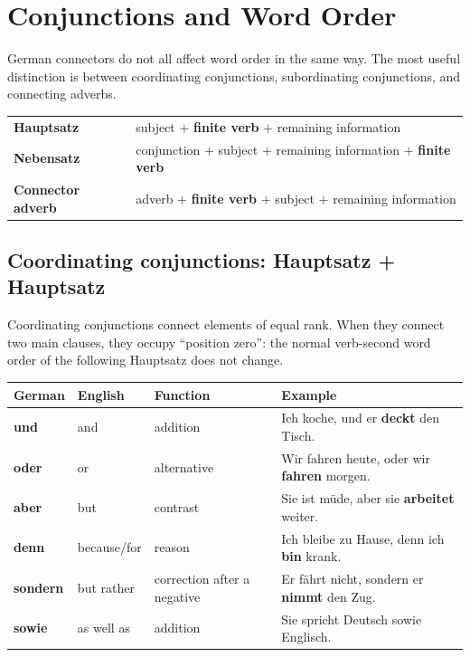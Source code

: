 \chapter{Conjunctions and Word Order}

German connectors do not all affect word order in the same way. The most
useful distinction is between coordinating conjunctions, subordinating
conjunctions, and connecting adverbs.

\begin{tcolorbox}[
  colback=black!3,
  colframe=black!55,
  title={Three patterns to remember},
  fonttitle=\bfseries
]
\begin{tabularx}{\textwidth}{@{}>{\bfseries}l X@{}}
Hauptsatz & subject $+$ \textbf{finite verb} $+$ remaining information \\
Nebensatz & conjunction $+$ subject $+$ remaining information $+$ \textbf{finite verb} \\
Connector adverb & adverb $+$ \textbf{finite verb} $+$ subject $+$ remaining information
\end{tabularx}
\end{tcolorbox}

\section{Coordinating conjunctions: Hauptsatz + Hauptsatz}

Coordinating conjunctions connect elements of equal rank. When they connect
two main clauses, they occupy ``position zero'': the normal verb-second word
order of the following Hauptsatz does not change.

\begin{center}
\small
{}
\begin{tabularx}{\textwidth}{@{}>{\bfseries}l l l X@{}}
\toprule
German & English & Function & Example \\
\midrule
und & and & addition & Ich koche, und er \textbf{deckt} den Tisch. \\
oder & or & alternative & Wir fahren heute, oder wir \textbf{fahren} morgen. \\
aber & but & contrast & Sie ist müde, aber sie \textbf{arbeitet} weiter. \\
denn & because/for & reason & Ich bleibe zu Hause, denn ich \textbf{bin} krank. \\
sondern & but rather & correction after a negative & Er fährt nicht, sondern er \textbf{nimmt} den Zug. \\
sowie & as well as & addition & Sie spricht Deutsch sowie Englisch. \\
\bottomrule
\end{tabularx}
\end{center}

